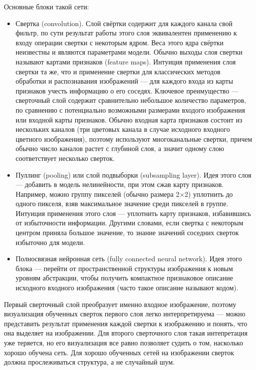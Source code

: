 \documentclass[12pt,fleqn]{article}
\begin{document}
Основные блоки такой сети:
\begin{itemize}
\item Свертка (convolution). Слой свёртки содержит для каждого канала свой фильтр, по сути результат работы этого слоя эквивалентен применению к входу операции свертки с некоторым ядром. Веса этого ядра свёртки неизвестны и являются параметрами модели. Обычно выходы слоя свертки называют картами признаков (feature maps). Интуиция применения слоя свертки та же, что и применение свертки для классических методов обработки и распознавания изображений --- для каждого входа из карты признаков учесть информацию о его соседях. Ключевое преимущество --- сверточный слой содержит сравнительно небольшое количество параметров, по сравнению с потенциально возможными размерами входого изображения или входной карты признаков. Обычно входная карта признаков состоит из нескольких каналов (три цветовых канала в случае исходного входного цветного изображения), поэтому используют многоканальные свертки, причем обычно число каналов растет с глубиной слоя, а значит одному слою соответствует несколько сверток.
\item Пуллинг (pooling) или слой подвыборки (subsampling layer). Идея этого слоя --- добавить в модель нелинейности, при этом сжав карту признаков. Например, можно группу пикселей (обычно размера 2×2) уплотнить до одного пикселя, взяв максимальное значение среди пикселей в группе. Интуиция применения этого слоя --- уплотнить карту признаков, избавившись от избыточности информации. Другими словами, если свертка с некоторым центром приняла большое значение, то знание значений соседних сверток избыточно для модели.
\item Полносвязная нейронная сеть (fully connected neural network). Идея этого блока --- перейти от пространственной структуры изображения к новым уровням абстракции, чтобы получить компактное признаковое описание исходного входного изображения (часто такое описание называют кодом).
\end{itemize}

Первый сверточный слой преобразует именно входное изображение, поэтому визуализация обученных сверток первого слоя легко интерпретируема --- можно представить результат применения каждой свертки к изображению и понять, что она выделяет на изображении. Для второго сверточного слоя такая интепретация уже теряется, но его визуализация все равно позволяет судить о том, насколько хорошо обучена сеть. Для хорошо обученных сетей на изображении сверток должна прослеживаться структура, а не случайный шум. 
\end{document}
